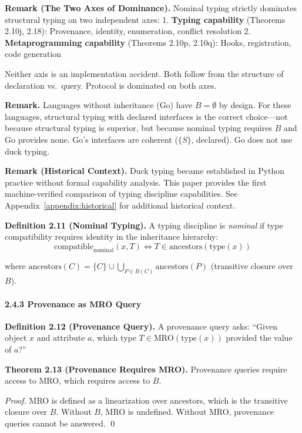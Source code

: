 \textbf{Remark (The Two Axes of Dominance).} Nominal typing strictly
dominates structural typing on two independent axes: 1. \textbf{Typing
capability} (Theorems 2.10j, 2.18): Provenance, identity, enumeration,
conflict resolution 2. \textbf{Metaprogramming capability} (Theorems
2.10p, 2.10q): Hooks, registration, code generation

Neither axis is an implementation accident. Both follow from the
structure of declaration vs.~query. Protocol is dominated on both axes.

\textbf{Remark.} Languages without inheritance (Go) have
\(B = \emptyset\) by design. For these languages, structural typing with
declared interfaces is the correct choice---not because structural
typing is superior, but because nominal typing requires \(B\) and Go
provides none. Go's interfaces are coherent (\(\{S\}\), declared). Go does not
use duck typing.

\textbf{Remark (Historical Context).} Duck typing became established in
Python practice without formal capability analysis. This paper provides
the first machine-verified comparison of typing discipline capabilities.
See Appendix~\ref{appendix:historical} for additional historical context.

\textbf{Definition 2.11 (Nominal Typing).} A typing discipline is
\emph{nominal} if type compatibility requires identity in the
inheritance hierarchy:
\[\text{compatible}_{\text{nominal}}(x, T) \iff T \in \text{ancestors}(\text{type}(x))\]

where
\(\text{ancestors}(C) = \{C\} \cup \bigcup_{P \in B(C)} \text{ancestors}(P)\)
(transitive closure over \(B\)).

\paragraph{2.4.3 Provenance as MRO Query}\label{provenance-as-mro-query}

\textbf{Definition 2.12 (Provenance Query).} A provenance query asks:
``Given object \(x\) and attribute \(a\), which type
\(T \in \text{MRO}(\text{type}(x))\) provided the value of \(a\)?''

\textbf{Theorem 2.13 (Provenance Requires MRO).} Provenance queries
require access to MRO, which requires access to \(B\).

\emph{Proof.} MRO is defined as a linearization over ancestors, which is
the transitive closure over \(B\). Without \(B\), MRO is undefined.
Without MRO, provenance queries cannot be answered. \qed

